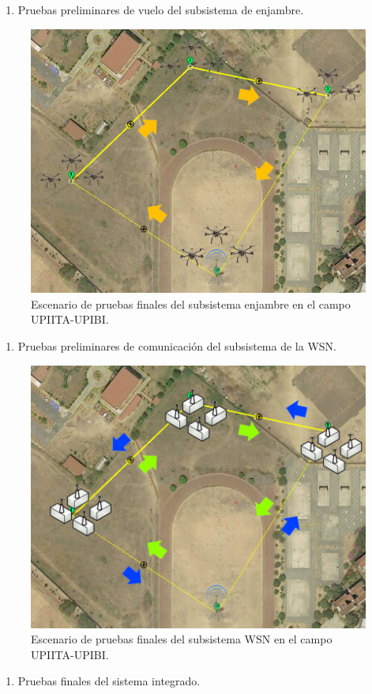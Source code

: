 \begin{enumerate}
    \item Pruebas preliminares de vuelo del subsistema de enjambre.
\end{enumerate}
    \newpage
\begin{figure}[H]
    \centering
    \includegraphics[width=0.6\linewidth]{imagenes/1_1.jpg}
    \caption{Escenario de pruebas finales del subsistema enjambre en el campo UPIITA-UPIBI.}
    \label{fig:enter-label}
\end{figure}

\begin{enumerate}[start=2]
    \item Pruebas preliminares de comunicación del subsistema de la WSN.
\end{enumerate}

\begin{figure}[H]
    \centering
    \includegraphics[width=0.65\linewidth]{imagenes/2.png}
    \caption{Escenario de pruebas finales del subsistema WSN en el campo UPIITA-UPIBI.}
    \label{fig:enter-label}
\end{figure}
\begin{enumerate}[start=3]
    \item Pruebas finales del sistema integrado.
\end{enumerate}

